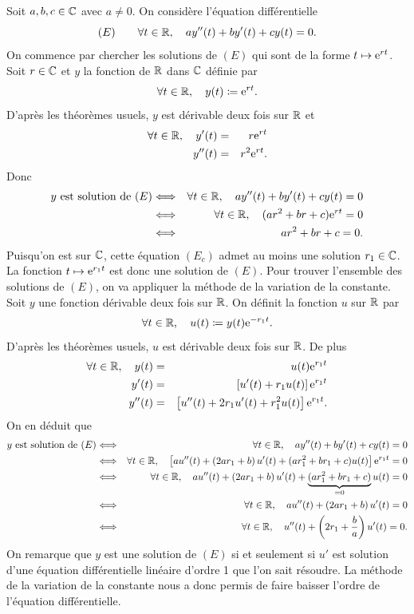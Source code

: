 \documentclass{magnolia}
\begin{document}
\begin{preuve}
\begin{francois}
Soit $a, b, c\in\mathbb{C}$ avec $a\neq 0$. On considère l'équation différentielle
\[(E)\qquad \forall t\in\mathbb{R} ,\quad a y''(t)+by'(t)+cy(t)=0.\]
On commence par chercher les solutions de $(E)$ qui sont de la forme $t\mapsto{\rm e}^{r t}$. Soit $r\in\mathbb{C}$ et $y$ la fonction de $\mathbb{R}$ dans $\mathbb{C}$ définie par
\[\forall t\in\mathbb{R},\quad y(t)\coloneqq{\rm e}^{rt}.\]
D'après les théorèmes usuels, $y$ est dérivable deux fois sur $\mathbb{R}$ et
\begin{eqnarray*}
\forall t\in\mathbb{R},\quad y'(t)&=&r{\rm e}^{rt}\\
y''(t)&=&r^2{\rm e}^{rt}.
\end{eqnarray*}
Donc
\begin{eqnarray*}
\text{$y$ est solution de $(E)$}
&\Longleftrightarrow& \forall t\in\mathbb{R} ,\quad a y''(t)+by'(t)+cy(t)=0\\
&\Longleftrightarrow& \forall t\in \mathbb{R},\quad (ar^2+br+c){\rm e}^{rt}=0\\
&\Longleftrightarrow& ar^2+br+c=0.
\end{eqnarray*}
Puisqu'on est sur $\mathbb{C}$, cette équation $(E_c)$ admet au moins une solution $r_1\in\mathbb{C}$. La fonction $t\mapsto {\rm e}^{r_1 t}$ est donc une solution de $(E)$. Pour trouver l'ensemble des solutions de $(E)$, on va appliquer la méthode de la variation de la constante. Soit $y$ une fonction dérivable deux fois sur $\mathbb{R}$. On définit la fonction $u$ sur $\mathbb{R}$ par
\[\forall t\in\mathbb{R},\quad u(t)\coloneqq y(t){\rm e}^{-r_1 t}.\]
D'après les théorèmes usuels, $u$ est dérivable deux fois sur $\mathbb{R}$. De plus
\begin{eqnarray*}
\forall t\in\mathbb{R},\quad y(t)&=&u(t){\rm e}^{r_1 t}\\
y'(t)&=&\left[u'(t)+r_1 u(t)\right]{\rm e}^{r_1 t}\\
y''(t)&=&\left[u''(t)+2r_1 u'(t)+r_1^2 u(t)\right]{\rm e}^{r_1 t}.
\end{eqnarray*}
On en déduit que
\begin{eqnarray*}
\text{$y$ est solution de $(E)$}
&\Longleftrightarrow& \forall t\in\mathbb{R} ,\quad a y''(t)+by'(t)+cy(t)=0\\
&\Longleftrightarrow& \forall t\in \mathbb{R},\quad \left[a u''(t)+\left(2ar_1+b\right)u'(t)+(ar_1^2+br_1+c)u(t)\right]{\rm e}^{r_1 t}=0\\
&\Longleftrightarrow& \forall t\in \mathbb{R},\quad a u''(t)+\left(2ar_1+b\right)u'(t)+\underbrace{(ar_1^2+br_1+c)}_{=0}u(t)=0\\
&\Longleftrightarrow& \forall t\in \mathbb{R},\quad a u''(t)+\left(2ar_1+b\right)u'(t)=0\\
&\Longleftrightarrow& \forall t\in \mathbb{R},\quad u''(t)+\left(2r_1+\frac{b}{a}\right)u'(t)=0.
\end{eqnarray*}
On remarque que $y$ est une solution de $(E)$ si et seulement si $u'$ est solution d'une équation différentielle linéaire d'ordre 1 que l'on sait résoudre. La méthode de la variation de la constante nous a donc permis de faire baisser l'ordre de l'équation différentielle.

\end{francois}
\end{preuve}
\end{document}
